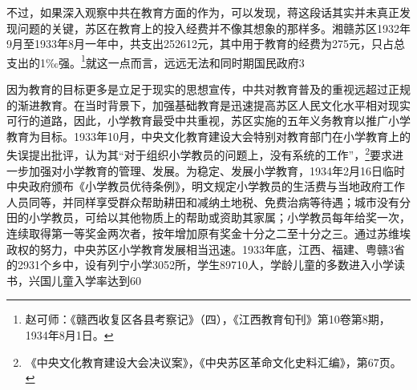 不过，如果深入观察中共在教育方面的作为，可以发现，蒋这段话其实并未真正发现问题的关键，苏区在教育上的投入经费并不像其想象的那样多。湘赣苏区1932年9月至1933年8月一年中，共支出252612元，其中用于教育的经费为275元，只占总支出的1‰强。\footnote{赵可师：《赣西收复区各县考察记》（四），《江西教育旬刊》第10卷第8期，1934年8月1日。}就这一点而言，远远无法和同时期国民政府3%


因为教育的目标更多是立足于现实的思想宣传，中共对教育普及的重视远超过正规的渐进教育。在当时背景下，加强基础教育是迅速提高苏区人民文化水平相对现实可行的道路，因此，小学教育最受中共重视，苏区实施的五年义务教育以推广小学教育为目标。1933年10月，中央文化教育建设大会特别对教育部门在小学教育上的失误提出批评，认为其“对于组织小学教员的问题上，没有系统的工作”，\footnote{《中央文化教育建设大会决议案》，《中央苏区革命文化史料汇编》，第67页。}要求进一步加强对小学教育的管理、发展。为稳定、发展小学教育，1934年2月16日临时中央政府颁布《小学教员优待条例》，明文规定小学教员的生活费与当地政府工作人员同等，并同样享受群众帮助耕田和减纳土地税、免费治病等待遇；城市没有分田的小学教员，可给以其他物质上的帮助或资助其家属；小学教员每年给奖一次，连续取得第一等奖金两次者，按年增加原有奖金十分之二至十分之三。通过苏维埃政权的努力，中央苏区小学教育发展相当迅速。1933年底，江西、福建、粤赣3省的2931个乡中，设有列宁小学3052所，学生89710人，学龄儿童的多数进入小学读书，兴国儿童入学率达到60%


